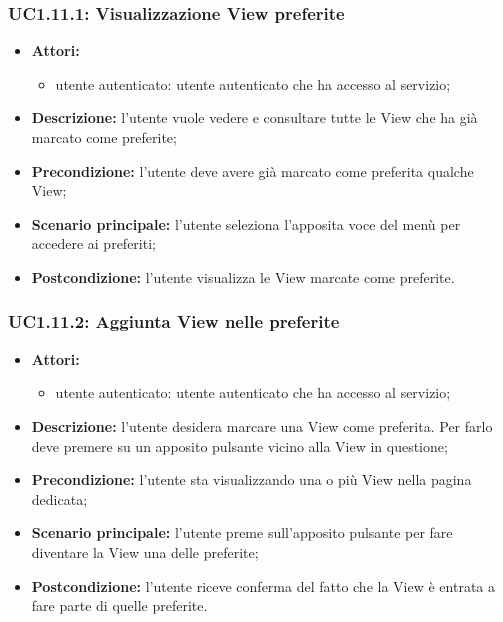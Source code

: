 \subsubsection{UC1.11.1: Visualizzazione View preferite}
\begin{itemize}
	\item \textbf{Attori:}
	\begin{itemize}
		\item utente autenticato: utente autenticato che ha accesso al servizio;
	\end{itemize}
	\item \textbf{Descrizione:} l'utente vuole vedere e consultare tutte le View che ha già marcato come preferite;
	\item \textbf{Precondizione:} l'utente deve avere già marcato come preferita qualche View;
	\item \textbf{Scenario principale:} l'utente seleziona l'apposita voce del menù per accedere ai preferiti;
	\item \textbf{Postcondizione:} l'utente visualizza le View marcate come preferite.
\end{itemize}

\subsubsection{UC1.11.2: Aggiunta View nelle preferite}
\begin{itemize}
	\item \textbf{Attori:}
	\begin{itemize}
		\item utente autenticato: utente autenticato che ha accesso al servizio;
	\end{itemize}
	\item \textbf{Descrizione:} l'utente desidera marcare una View come preferita. Per farlo deve premere su un apposito pulsante vicino alla View in questione;
	\item \textbf{Precondizione:} l'utente sta visualizzando una o più View nella pagina dedicata;
	\item \textbf{Scenario principale:} l'utente preme sull'apposito pulsante per fare diventare la View una delle preferite;
	\item \textbf{Postcondizione:} l'utente riceve conferma del fatto che la View è entrata a fare parte di quelle preferite.
\end{itemize}


